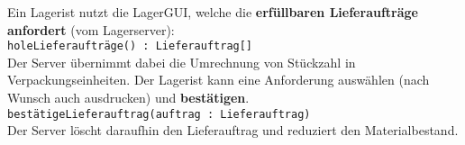 Ein Lagerist nutzt die LagerGUI, welche die \textbf{erfüllbaren Lieferaufträge anfordert} (vom Lagerserver):\\
\medskip
\texttt{holeLieferaufträge() : Lieferauftrag[]}\\
\medskip
Der Server übernimmt dabei die Umrechnung von Stückzahl in Verpackungseinheiten.
Der Lagerist kann eine Anforderung auswählen (nach Wunsch auch ausdrucken) und \textbf{bestätigen}.\\
\medskip
\texttt{bestätigeLieferauftrag(auftrag : Lieferauftrag)}\\
\medskip
Der Server löscht daraufhin den Lieferauftrag und reduziert den Materialbestand.